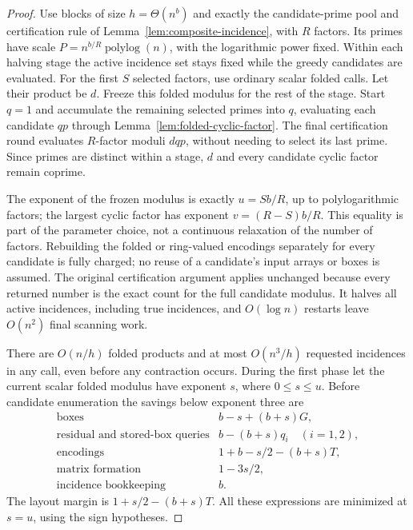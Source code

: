 \documentclass[11pt]{article}
\begin{document}
\begin{proof}
Use blocks of size $h=\Theta(n^b)$ and exactly the candidate-prime pool
and certification rule of Lemma~\ref{lem:composite-incidence}, with $R$
factors. Its primes have scale
$P=n^{b/R}\operatorname{polylog}(n)$, with the logarithmic power fixed.
Within each halving stage the active incidence set stays fixed while the
greedy candidates are evaluated. For the first $S$ selected factors, use
ordinary scalar folded calls. Let their product be $d$. Freeze this
folded modulus for the rest of the stage. Start $q=1$ and accumulate the
remaining selected primes into $q$, evaluating each candidate $qp$
through Lemma~\ref{lem:folded-cyclic-factor}. The final certification
round evaluates $R$-factor moduli $dqp$, without needing to select its
last prime. Since primes are distinct within a stage, $d$ and every
candidate cyclic factor remain coprime.

The exponent of the frozen modulus is exactly $u=Sb/R$, up to
polylogarithmic factors; the largest cyclic factor has exponent
$v=(R-S)b/R$. This equality is part of the parameter choice, not a
continuous relaxation of the number of factors. Rebuilding the folded
or ring-valued encodings separately for every candidate is fully charged;
no reuse of a candidate's input arrays or boxes is assumed. The original
certification argument applies unchanged because every returned number
is the exact count for the full candidate modulus. It halves all active
incidences, including true incidences, and $O(\log n)$ restarts leave
$O(n^2)$ final scanning work.

There are $O(n/h)$ folded products and at most $O(n^3/h)$ requested
incidences in any call, even before any contraction occurs. During the
first phase let the current scalar folded modulus have exponent $s$,
where $0\le s\le u$. Before candidate enumeration the savings below
exponent three are
\[
\begin{array}{ll}
\text{boxes}&b-s+(b+s)G,\\
\text{residual and stored-box queries}&b-(b+s)q_i\quad(i=1,2),\\
\text{encodings}&1+b-s/2-(b+s)T,\\
\text{matrix formation}&1-3s/2,\\
\text{incidence bookkeeping}&b.
\end{array}
\]
The layout margin is $1+s/2-(b+s)T$. All these expressions are minimized
at $s=u$, using the sign hypotheses.


\end{proof}
\end{document}
